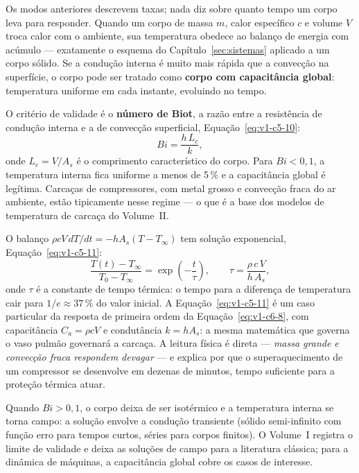 \documentclass[12pt,a4paper]{article}
\numberwithin{equation}{section}
\numberwithin{table}{section}
\numberwithin{figure}{section}
\begin{document}
Os modos anteriores descrevem taxas; nada diz sobre quanto tempo um corpo
leva para responder. Quando um corpo de massa $m$, calor específico $c$ e
volume $V$ troca calor com o ambiente, sua temperatura obedece ao balanço de
energia com acúmulo --- exatamente o esquema do
Capítulo~\ref{sec:sistemas} aplicado a um corpo sólido. Se a condução
interna é muito mais rápida que a convecção na superfície, o corpo pode ser
tratado como \textbf{corpo com capacitância global}: temperatura uniforme em
cada instante, evoluindo no tempo.

O critério de validade é o \textbf{número de Biot}, a razão entre a
resistência de condução interna e a de convecção superficial,
Equação~\eqref{eq:v1-c5-10}:
\begin{equation}\label{eq:v1-c5-10}
Bi = \frac{h\,L_c}{k},
\end{equation}
onde $L_c = V/A_s$ é o comprimento característico do corpo. Para $Bi < 0{,}1$,
a temperatura interna fica uniforme a menos de 5\,\% e a capacitância global
é legítima. Carcaças de compressores, com metal grosso e convecção fraca do
ar ambiente, estão tipicamente nesse regime --- o que é a base dos modelos de
temperatura de carcaça do Volume~II.

O balanço $\rho c V \, dT/dt = -hA_s (T - T_\infty)$ tem solução
exponencial, Equação~\eqref{eq:v1-c5-11}:
\begin{equation}\label{eq:v1-c5-11}
\frac{T(t) - T_\infty}{T_0 - T_\infty} =
\exp\!\left(-\frac{t}{\tau}\right),
\qquad
\tau = \frac{\rho\,c\,V}{h\,A_s},
\end{equation}
onde $\tau$ é a constante de tempo térmica: o tempo para a diferença de
temperatura cair para $1/e \approx 37\,\%$ do valor inicial. A
Equação~\eqref{eq:v1-c5-11} é um caso particular da resposta de primeira
ordem da Equação~\eqref{eq:v1-c6-8}, com capacitância $C_a = \rho c V$ e
condutância $k = h A_s$: a mesma matemática que governa o vaso pulmão
governará a carcaça. A leitura física é direta --- \emph{massa grande e
convecção fraca respondem devagar} --- e explica por que o superaquecimento
de um compressor se desenvolve em dezenas de minutos, tempo suficiente para
a proteção térmica atuar.

Quando $Bi > 0{,}1$, o corpo deixa de ser isotérmico e a temperatura interna
se torna campo: a solução envolve a condução transiente (sólido semi-infinito
com função erro para tempos curtos, séries para corpos finitos). O Volume~I
registra o limite de validade e deixa as soluções de campo para a literatura
clássica; para a dinâmica de máquinas, a capacitância global cobre os casos
de interesse.
\end{document}
